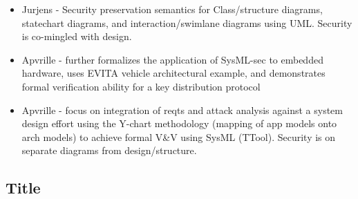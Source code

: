 \documentclass[11pt]{article}
\begin{document}
\begin{itemize}

    \item Jurjens - Security preservation semantics for Class/structure diagrams, statechart diagrams, and interaction/swimlane diagrams using UML.  Security is co-mingled with design. \cite{jurjens2001towards}
    
    \item Apvrille - further formalizes the application of SysML-sec to embedded hardware, uses EVITA vehicle architectural example, and demonstrates formal verification ability for a key distribution protocol \cite{apvrille2013sysml}
    
    \item Apvrille - focus on integration of reqts and attack analysis against a system design effort using the Y-chart methodology (mapping of app models onto arch models) to achieve formal V\&V using SysML (TTool).  Security is on separate diagrams from design/structure. \cite{roudier2015sysml}
    
\end{itemize}





\newpage
{}






\appendixtitleon
\begin{appendices}


\clearpage
\begin{center}
    \section{Title}
\end{center}


\end{appendices}
\end{document}
